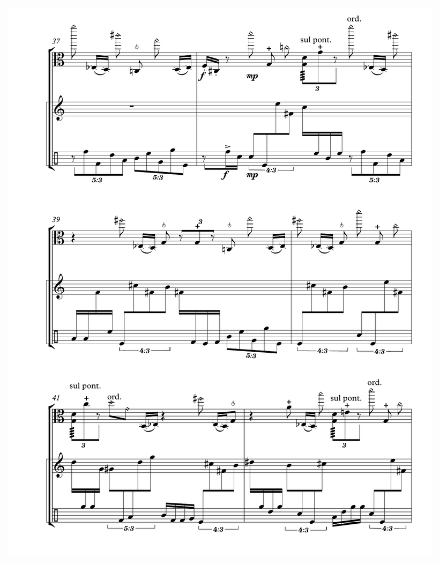 \begin{figure}[htbp]
    \centering
	\includegraphics[width=6.5in]{figures/Viola_Percussion_6.pdf}
\end{figure}

